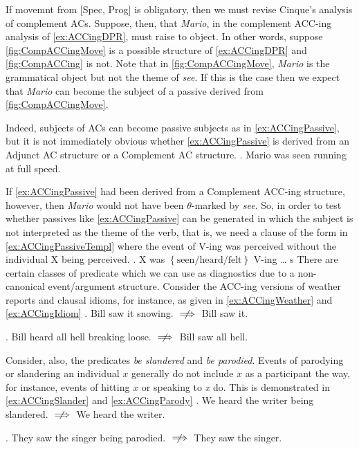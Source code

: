 \documentclass[MilwayThesis]{subfiles}
\begin{document}
If movemnt from [Spec, Prog] is obligatory, then we must revise Cinque's analysis of complement ACs.
Suppose, then, that \textit{Mario}, in the complement ACC-ing analysis of \cref{ex:ACCingDPR}, must raise to object.
In other words, suppose \cref{fig:CompACCingMove} is a possible structure of \cref{ex:ACCingDPR} and \cref{fig:CompACCing} is not.
Note that in \cref{fig:CompACCingMove}, \textit{Mario} is the grammatical object but not the theme of \textit{see}.
If this is the case then we expect that \textit{Mario} can become the subject of a passive derived from \cref{fig:CompACCingMove}.

Indeed, subjects of ACs can become passive subjects as in \cref{ex:ACCingPassive}, but it is not immediately obvious whether \cref{ex:ACCingPassive} is derived from an Adjunct AC structure or a Complement AC structure.
\ex. Mario was seen running at full speed. \label{ex:ACCingPassive}

If \cref{ex:ACCingPassive} had been derived from a Complement ACC-ing structure, however, then \textit{Mario} would not have been $\theta$-marked by \textit{see}.
So, in order to test whether passives like \cref{ex:ACCingPassive} can be generated in which the subject is not interpreted as the theme of the verb, that is, we need a clause of the form in \cref{ex:ACCingPassiveTempl} where the event of V-ing was perceived without the individual X being perceived.
\ex. X was $\left\{ \text{seen/heard/felt} \right\}$ V-ing \ldots
s
There are certain classes of predicate which we can use as diagnostics due to a non-canonical event/argument structure.
Consider the ACC-ing versions of weather reports and clausal idioms, for instance, as given in \cref{ex:ACCingWeather} and \cref{ex:ACCingIdiom}
\ex. Bill saw it snowing. $\centernot\implies$ Bill saw it. \label{ex:ACCingWeather}

\ex. Bill heard all hell breaking loose. $\centernot\implies$ Bill saw all hell. \label{ex:ACCingIdiom}

Consider, also, the predicates \textit{be slandered} and \textit{be parodied}.
Events of parodying or slandering an individual $x$ generally do not include $x$ as a participant the way, for instance, events of hitting $x$ or speaking to \textit{x} do.
This is demonstrated in \cref{ex:ACCingSlander} and \cref{ex:ACCingParody}
\ex. We heard the writer being slandered. $\centernot\implies$ We heard the writer. \label{ex:ACCingSlander}

\ex. They saw the singer being parodied. $\centernot\implies$ They saw the singer. \label{ex:ACCingParody}
\end{document}
